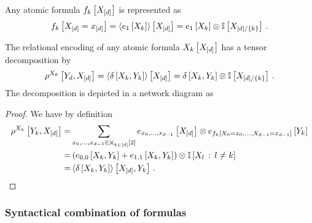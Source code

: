 \begin{theorem}
	Any atomic formula $f_{k}\left[X_{[d]}\right]$ is represented as
		\[ f_{k}\left[X_{[d]}=x_{[d]}\right] 
		= \left\langle e_1\left[X_{k}\right]\right\rangle \left[ X_{[d]} \right]
		= e_1\left[X_{k}\right] \otimes \mathbb{I}\left[X_{[d]/\{k\}}\right]  \, . \]	

	The relational encoding of any atomic formula $X_{k}\left[X_{[d]}\right]$ has a tensor decomposition by
		\[ \rho^{X_{k}}\left[Y_{d},X_{[d]}\right]
		= \left\langle \delta\left[X_{k},Y_{k}\right]\right\rangle \left[ X_{[d]} \right]
		= \delta\left[X_{k},Y_{k}\right] \otimes \mathbb{I}\left[X_{[d]/\{k\}}\right] \, . \]
	The decomposition is depicted in a network diagram as
	\begin{center}
		
	\end{center}
\end{theorem}
\begin{proof}
	We have by definition
	\begin{align*}
		\rho^{X_{k}}\left[Y_{k},X_{[d]}\right]
		=& \sum_{x_{0},\ldots,x_{d-1}\in\bigtimes_{k\in[d]}[2]} e_{x_{0},\ldots,x_{d-1}}\left[X_{[d]}\right] \otimes e_{f_{k}\left[X_{0}=x_{0},\ldots,X_{d-1}=x_{d-1}\right]}\left[Y_{k}\right] \\
		=& \left( e_{0,0}\left[X_{k},Y_{k}\right] +
		e_{1,1}\left[X_{k},Y_{k}\right] \right) \otimes \mathbb{I}\left[X_{l}\, : \, l \neq k\right] \\
		=& \left\langle \delta\left[X_{k},Y_{k}\right]\right\rangle \left[ X_{[d]},Y_{k} \right] \, .
	\end{align*} 
\end{proof}

\subsubsection{Syntactical combination of formulas}

